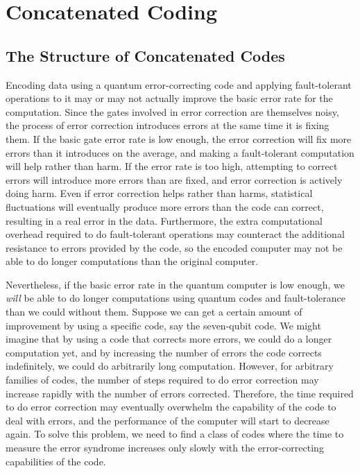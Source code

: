 \documentclass{report}
\begin{document}
\chapter{Concatenated Coding}
\label{chap-concatenation}

\section{The Structure of Concatenated Codes}

Encoding data using a quantum error-correcting code and applying 
fault-tol\-er\-ant operations to it may or may not actually improve the basic 
error rate for the computation.  Since the gates involved in error correction 
are themselves noisy, the process of error correction introduces errors at 
the same time it is fixing them.  If the basic gate error rate is low enough, 
the error correction will fix more errors than it introduces on the average, 
and making a fault-tolerant computation will help rather than harm.  If 
the error rate is too high, attempting to correct errors will introduce more 
errors than are fixed, and error correction is actively doing harm.  Even if 
error correction helps rather than harms, statistical fluctuations will 
eventually produce more errors than the code can correct, resulting in a 
real error in the data.  Furthermore, the extra computational overhead 
required to do fault-tolerant operations may counteract the additional 
resistance to errors provided by the code, so the encoded computer may 
not be able to do longer computations than the original computer.

Nevertheless, if the basic error rate in the quantum computer is low 
enough, we {\em will} be able to do longer computations using quantum 
codes and fault-tolerance than we could without them.  Suppose we can get 
a certain amount of improvement by using a specific code, say the seven-qubit 
code.  We might imagine that by using a code that corrects more errors, we 
could do a longer computation yet, and by increasing the number of errors 
the code corrects indefinitely, we could do arbitrarily long computation.  
However, for arbitrary families of codes, the number of steps required to 
do error correction may increase rapidly with the number of errors 
corrected.  Therefore, the time required to do error correction may 
eventually overwhelm the capability of the code to deal with errors, and 
the performance of the computer will start to decrease again.  To solve this 
problem, we need to find a class of codes where the time to measure the 
error syndrome increases only slowly with the error-correcting capabilities 
of the code.
\end{document}
